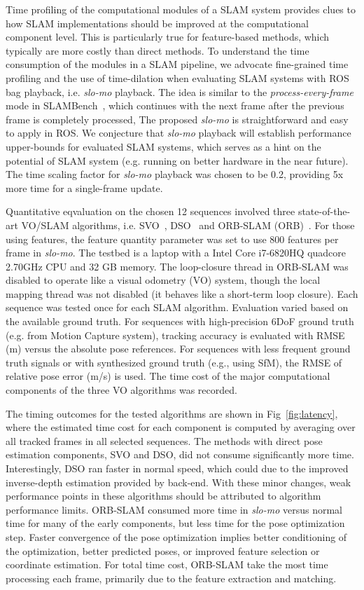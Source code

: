 Time profiling of the computational modules of a SLAM system provides
clues to how SLAM implementations should be improved at the
computational component level.  This is particularly true for
feature-based methods, which typically are more costly than direct
methods.
To understand the time consumption of the modules in a SLAM 
pipeline, we advocate fine-grained time profiling and the use of
time-dilation when evaluating SLAM systems with ROS bag playback, i.e.
\textit{slo-mo} playback. 
The idea is similar to the \textit{process-every-frame} mode in 
SLAMBench~\cite{nardi2015introducing}, which continues with the next frame 
after the previous frame is completely processed, The proposed 
\textit{slo-mo} is straightforward and easy to apply in ROS. 
We conjecture that \textit{slo-mo} playback will establish performance 
upper-bounds for evaluated SLAM systems, which serves as a hint on the
potential of SLAM system (e.g. running on better hardware in the near
future).
The time scaling factor for \textit{slo-mo} playback was chosen to be
0.2, providing 5x more time for a single-frame update.

Quantitative eqvaluation on the chosen 12 sequences involved three 
state-of-the-art VO/SLAM algorithms, i.e. SVO~\cite{SVO2017},
DSO~\cite{DSO2017} and ORB-SLAM (ORB)~\cite{ORBSLAM}.  For those using
features, the feature quantity parameter was set to use 800 features 
per frame in \textit{slo-mo}. 
The testbed is a laptop with a Intel Core i7-6820HQ quadcore 2.70GHz 
CPU and 32 GB memory. 
The loop-closure thread in ORB-SLAM was disabled to operate like a
visual odometry (VO) system, though the local mapping thread was not
disabled (it behaves like a short-term loop closure). 
Each sequence was tested once for each SLAM algorithm.
Evaluation varied based on the available ground truth.
For sequences with high-precision 6DoF ground truth 
(e.g. from Motion Capture system), tracking accuracy is evaluated 
with RMSE (m) versus the absolute pose references.  
For sequences with less frequent ground truth signals or with
synthesized ground truth (e.g., using SfM), the RMSE of relative pose error 
(m/s) is used.  The time cost of the major computational components of
the three VO algorithms was recorded.

The timing outcomes for the tested algorithms are shown in
Fig~\ref{fig:latency}, where the estimated time cost for each component 
is computed by averaging over all tracked frames in all selected sequences. 
The methods with direct pose estimation components, SVO and DSO, did not
consume significantly more time. 
Interestingly, DSO ran faster in normal speed, which could due to 
the improved inverse-depth estimation provided by back-end.  
With these minor changes, weak performance points 
in these algorithms should be attributed to algorithm performance limits.
ORB-SLAM consumed more time in \textit{slo-mo} versus normal time for
many of the early components, but less time for the pose optimization
step. Faster convergence of the pose optimization implies better
conditioning of the optimization, better predicted poses, or improved
feature selection or coordinate estimation.
For total time cost, ORB-SLAM take the most time processing each frame,
primarily due to the feature extraction and matching.

